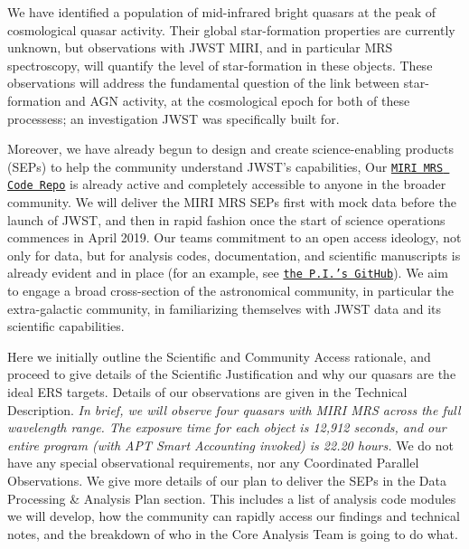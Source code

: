 We have identified a population of mid-infrared
bright quasars at the peak of cosmological quasar activity. Their
global star-formation properties are currently unknown, but
observations with JWST MIRI, and in particular MRS spectroscopy, will
quantify the level of star-formation in these objects. 
These observations will address the fundamental question of 
the link between star-formation and AGN activity, at the cosmological 
epoch for both of these processess; an investigation JWST was specifically
built for.   

\smallskip \smallskip
\noindent
Moreover, we have already begun to design and create science-enabling
products (SEPs) to help the community understand JWST's capabilities,
Our \href{https://github.com/miri-mrs}{{\tt MIRI MRS Code Repo}} is
already active and completely accessible to anyone in the broader
community.  We will deliver the MIRI MRS SEPs first with mock data
before the launch of JWST, and then in rapid fashion once the start of
science operations commences in April 2019.
Our teams commitment to an open access ideology, not only for data,
but for analysis codes, documentation, and scientific manuscripts is
already evident and in place (for an example, see
\href{https://github.com/d80b2t}{{\tt the P.I.'s GitHub}}).  We aim to
engage a broad cross-section of the astronomical community, in
particular the extra-galactic community, in familiarizing themselves
with JWST data and its scientific capabilities.

\smallskip \smallskip
\noindent
Here we initially outline the Scientific and Community Access
rationale, and proceed to give details of the Scientific Justification
and why our quasars are the ideal ERS targets.  Details of our
observations are given in the Technical Description. {\it In brief, we
will observe four quasars with MIRI MRS across the full wavelength
range. The exposure time for each object is 12,912 seconds, and our
entire program (with APT Smart Accounting invoked) is 22.20 hours.}
We do not have any special observational requirements, nor any
Coordinated Parallel Observations.  We give more details of our plan
to deliver the SEPs in the Data Processing \& Analysis Plan
section. This includes a list of analysis code modules we will
develop, how the community can rapidly access our findings and
technical notes, and the breakdown of who in the Core Analysis Team is
going to do what.



